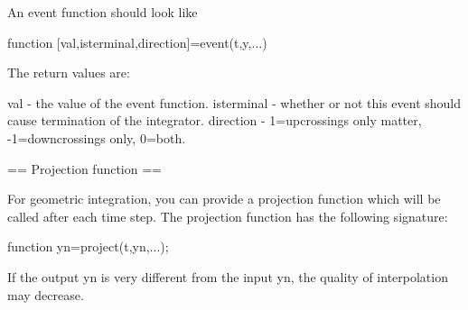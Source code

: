  An event function should look like

    function [val,isterminal,direction]=event(t,y,...)

 The return values are:

 val        - the value of the event function.
 isterminal - whether or not this event should cause termination of the integrator.
 direction  - 1=upcrossings only matter, -1=downcrossings only, 0=both.

 == Projection function ==

 For geometric integration, you can provide a projection function which will be
 called after each time step. The projection function has the following signature:

     function yn=project(t,yn,...);

 If the output yn is very different from the input yn, the quality of interpolation
 may decrease.
